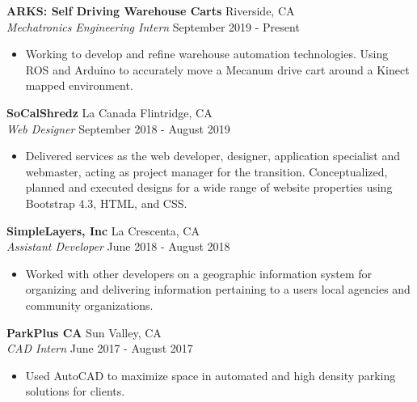 \documentclass[a4paper]{article}
\begin{document}
\textbf{ARKS: Self Driving Warehouse Carts} \hfill Riverside, CA\\
\textit{Mechatronics Engineering Intern} \hfill September 2019 - Present\\
\vspace{-1mm}
\begin{itemize} \itemsep 1pt
	\item Working to develop and refine warehouse automation technologies. Using ROS and Arduino to accurately move a Mecanum drive cart around a Kinect mapped environment.
\end{itemize}
\textbf{SoCalShredz} \hfill La Canada Flintridge, CA\\
\textit{Web Designer} \hfill September 2018 - August 2019\\
\vspace{-1mm}
\begin{itemize} \itemsep 1pt
	\item Delivered services as the web developer, designer, application specialist and webmaster, acting as project manager for the transition. Conceptualized, planned and executed designs for a wide range of website properties using Bootstrap 4.3, HTML, and CSS.
\end{itemize}
\textbf{SimpleLayers, Inc} \hfill La Crescenta, CA\\
\textit{Assistant Developer} \hfill June 2018 - August 2018\\
\vspace{-1mm}
\begin{itemize} \itemsep 1pt
	\item Worked with other developers on a geographic information system for organizing and delivering information pertaining to a user\textquotesingle{}s local agencies and community organizations.
\end{itemize}
\textbf{ParkPlus CA} \hfill Sun Valley, CA\\
\textit{CAD Intern} \hfill June 2017 - August 2017\\
\vspace{-1mm}
\begin{itemize} \itemsep 1pt
	\item Used AutoCAD to maximize space in automated and high density parking solutions for clients.
\end{itemize}


\vspace{2mm}
\end{document}
